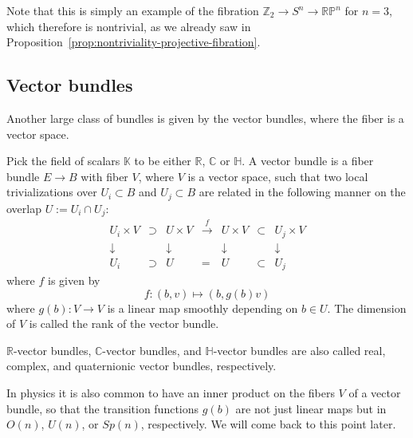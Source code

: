 \documentclass[12pt]{article}
\numberwithin{equation}{section}
\numberwithin{figure}{section}
\theoremstyle{remark}
\def\bC{\mathbb{C}}
\def\bH{\mathbb{H}}
\def\bK{\mathbb{K}}
\def\bR{\mathbb{R}}
\def\bZ{\mathbb{Z}}
\def\RP{\mathbb{RP}}
\begin{document}
Note that this is simply an example of the fibration $\bZ_2\to S^n\to \RP^n$
for $n=3$,
which therefore is nontrivial, as we already saw in Proposition~\ref{prop:nontriviality-projective-fibration}.

\subsection{Vector bundles}

Another large class of bundles is given by the vector bundles,
where the fiber is a vector space.

\begin{definition}
  Pick the field of scalars $\bK$ to be either $\bR$, $\bC$ or $\bH$.
  A vector bundle is a fiber bundle $E\to B$ with fiber $V$,
  where $V$ is a vector space, such that two local trivializations over $U_i \subset B$
  and $U_j\subset B$ are related in the following manner on the overlap $U:=U_i\cap U_j$:
  \begin{equation}
  \begin{array}{cccccccc}
    U_i \times V &\supset& U \times V & \xrightarrow{f } & 
    U \times V & \subset & U_j\times V \\
    \downarrow & & \downarrow & & \downarrow & & \downarrow \\
    U_i & \supset & U  & = & U  & \subset & U_j
  \end{array}
  \end{equation}
  where $f $ is given by \begin{equation}
    f : (b,v) \mapsto (b, g (b) v)
    \label{eq:vec-bundle-transition-functions}
  \end{equation} where $g (b): V\to V$ is a linear map smoothly depending on $b\in U$.
  The dimension of $V$ is called the rank of the vector bundle.
\end{definition}
$\bR$-vector bundles, $\bC$-vector bundles, and $\bH$-vector bundles
are also called real, complex, and quaternionic vector bundles, respectively.

In physics it is also common to have an inner product on the fibers $V$ of a vector bundle,
so that the transition functions $g (b)$ are not just linear maps
but in $O(n)$, $U(n)$, or $Sp(n)$, respectively.
We will come back to this point later.
\end{document}
